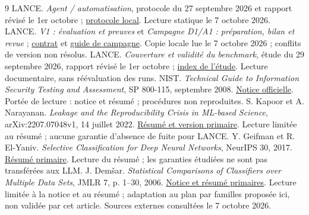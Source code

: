 \documentclass[11pt,a4paper]{article}
\begin{document}
{}
\begin{thebibliography}{9}
\small
{} LANCE. \emph{Agent / automatisation}, protocole du
27 septembre 2026 et rapport révisé le 1er octobre ;
\href{../2026-09-27-agent-vs-automation/protocol.md}{protocole local}.
Lecture statique le 7 octobre 2026.
 LANCE. \emph{V1 : évaluation et preuves} et
\emph{Campagne D1/A1 : préparation, bilan et revue} ;
\href{../../docs/benchmark/v1/evaluation.md}{contrat} et
\href{../../docs/benchmark/agent-vs-automation-campaign.md}{guide de campagne}.
Copie locale lue le 7 octobre 2026 ; conflits de version non résolus.
 LANCE. \emph{Couverture et validité du benchmark},
étude du 29 septembre 2026, rapport révisé le 1er octobre ;
\href{../2026-09-29-benchmark-coverage/README.md}{index de l'étude}.
Lecture documentaire, sans réévaluation des runs.
 NIST. \emph{Technical Guide to Information Security Testing
and Assessment}, SP 800-115, septembre 2008.
\href{https://www.nist.gov/publications/technical-guide-information-security-testing-and-assessment}{Notice officielle}.
Portée de lecture : notice et résumé ; procédures non reproduites.
 S. Kapoor et A. Narayanan. \emph{Leakage and the
Reproducibility Crisis in ML-based Science}, arXiv:2207.07048v1,
14 juillet 2022.
\href{https://arxiv.org/abs/2207.07048v1}{Résumé et version primaire}.
Lecture limitée au résumé ; aucune garantie d'absence de fuite pour LANCE.
 Y. Geifman et R. El-Yaniv. \emph{Selective Classification
for Deep Neural Networks}, NeurIPS 30, 2017.
\href{https://proceedings.neurips.cc/paper/2017/hash/4a8423d5e91fda00bb7e46540e2b0cf1-Abstract.html}{Résumé primaire}.
Lecture du résumé ; les garanties étudiées ne sont pas transférées aux LLM.
 J. Demšar. \emph{Statistical Comparisons of Classifiers
over Multiple Data Sets}, JMLR 7, p. 1--30, 2006.
\href{https://jmlr.org/papers/v7/demsar06a.html}{Notice et résumé primaires}.
Lecture limitée à la notice et au résumé ; adaptation au plan par familles
proposée ici, non validée par cet article. Sources externes consultées le
7 octobre 2026.
\end{thebibliography}
\end{document}
